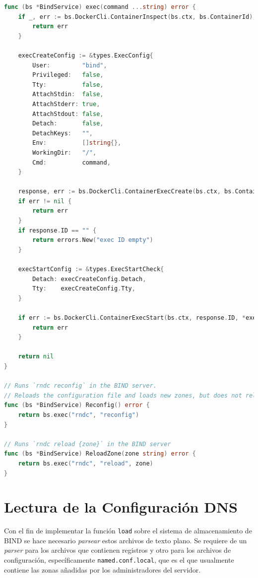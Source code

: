 \begin{lstlisting}[frame=single, language=Go, caption=Métodos para actualizar a BIND con los cambios en sus archivos.]
func (bs *BindService) exec(command ...string) error {
    if _, err := bs.DockerCli.ContainerInspect(bs.ctx, bs.ContainerId); err != nil {
        return err
    }

    execCreateConfig := &types.ExecConfig{
        User:         "bind",
        Privileged:   false,
        Tty:          false,
        AttachStdin:  false,
		AttachStderr: true,
        AttachStdout: false,
		Detach:       false,
        DetachKeys:   "",
        Env:          []string{},
        WorkingDir:   "/",
        Cmd:          command,
    }

    response, err := bs.DockerCli.ContainerExecCreate(bs.ctx, bs.ContainerId, *execCreateConfig)
    if err != nil {
        return err
    }
    if response.ID == "" {
        return errors.New("exec ID empty")
    }

    execStartConfig := &types.ExecStartCheck{
        Detach: execCreateConfig.Detach,
        Tty:    execCreateConfig.Tty,
    }

    if err := bs.DockerCli.ContainerExecStart(bs.ctx, response.ID, *execStartConfig); err != nil {
        return err
    }

    return nil
}

// Runs `rndc reconfig` in the BIND server.
// Reloads the configuration file and loads new zones, but does not reload existing zone files even if they have changed.
func (bs *BindService) Reconfig() error {
	return bs.exec("rndc", "reconfig")
}

// Runs `rndc reload {zone}` in the BIND server
func (bs *BindService) ReloadZone(zone string) error {
	return bs.exec("rndc", "reload", zone)
}
\end{lstlisting}

\section{Lectura de la Configuración DNS}

Con el fin de implementar la función \verb+load+ sobre el sistema de almacenamiento de BIND se hace necesario \textit{parsear} estos archivos de texto plano. Se requiere de un \textit{parser} para los archivos que contienen registros y otro para los archivos de configuración, específicamente \verb+named.conf.local+, que es el que usualmente contiene las zonas añadidas por los administradores del servidor.

